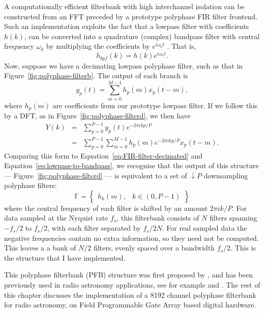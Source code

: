 \documentclass{ws-rv961x669}
\begin{document}
A computationally efficient filterbank with high interchannel isolation can be constructed from an FFT preceded by a prototype polyphase FIR filter frontend. Such an implementation exploits the fact that a lowpass filter with coefficients $h(k)$, can be converted into a quadrature (complex) bandpass filter with central frequency $\omega_{k}$ by multiplying the coefficients by $e^{i\omega_{k}t}$ . That is, 
\begin{equation}
h_{bpf}(k)=h(k)e^{i\omega_{k}t}.\label{eq:lowpass-to-bandpass}
\end{equation}
Now, suppose we have a decimating lowpass polyphase filter, such as that in Figure~\ref{fig:polyphase-filterb}. The output of each branch
is 
\begin{equation}
y_{p}(t)=\sum_{m=0}^{M-1}h_{p}(m)x_{p}(t-m),
\end{equation}
where $h_{p}(m)$ are coefficients from our prototype lowpass filter. If we follow this by a DFT, as in Figure~\ref{fig:polyphase-filterd}, we then have 
\begin{eqnarray}
Y(k) & = & \sum_{p=0}^{P-1}y_{p}(t)e^{-2\pi ikp/P}\\
 & = & \sum_{p=0}^{P-1}\sum_{m=0}^{M-1}h_{p}(m)e^{-2\pi ikp/P}x_{p}(t-m).
\end{eqnarray}
Comparing this form to Equation~\ref{eq:FIR-filter-decimated} and Equation~\ref{eq:lowpass-to-bandpass}, we recognise that the output
of this structure --- Figure~\ref{fig:polyphase-filterd} --- is equivalent to a set of $\downarrow P$ downsampling polyphase filters:
\begin{equation}
\mathbb{F}=\begin{Bmatrix}h_{k}(m), & k\in(0,P-1)\end{Bmatrix}
\end{equation}
where the central frequency of each filter is shifted by an amount $\mbox{2}\pi ik/P$. For data sampled at the Nyquist rate $f_{s}$,
this filterbank consists of $N$ filters spanning $-f_{s}/\mbox{2}$ to $f_{s}/\mbox{2}$, with each filter separated by $f_{s}/\mbox{2}N$.
For real sampled data the negative frequencies contain no extra information, so they need not be computed. This leaves a a bank of $N/\mbox{2}$ filters, evenly spaced over a bandwidth $f_{s}/\mbox{2}$. This is the structure that I have implemented.

This polyphase filterbank (PFB) structure was first proposed by \citet{Bellanger:1976p7898}, and has been previously used in radio astronomy applications, see for example \citet{Zimmerman:1991p6933} and \citet{Parsons:2006p257}. The rest of this chapter discusses the implementation of a 8192 channel polyphase filterbank for radio astronomy, on Field Programmable Gate Array based digital hardware.
\end{document}
